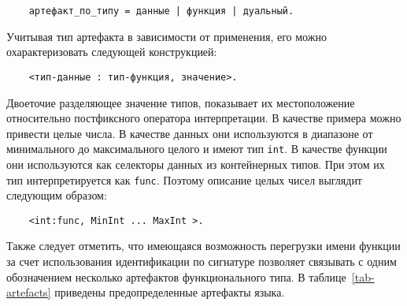 {\begin{verbatim}
    артефакт_по_типу = данные | функция | дуальный.
\end{verbatim}

Учитывая тип артефакта в зависимости от применения, его можно охарактеризовать следующей конструкцией:

\begin{verbatim}
    <тип-данные : тип-функция, значение>.
\end{verbatim}

Двоеточие разделяющее значение типов, показывает их местоположение относительно постфиксного оператора интерпретации. В качестве примера можно привести целые числа. В качестве данных они используются в диапазоне от минимального до максимального целого и имеют тип \verb|int|. В качестве функции они используются как селекторы данных из контейнерных типов. При этом их тип интерпретируется как \verb|func|. Поэтому описание целых чисел выглядит следующим образом:

\begin{verbatim}
    <int:func, MinInt ... MaxInt >.
\end{verbatim}

Также следует отметить, что имеющаяся возможность перегрузки имени функции за счет использования идентификации по сигнатуре позволяет связывать с одним обозначением несколько артефактов функционального типа. В таблице~\ref{tab-artefacts} приведены предопределенные артефакты языка.

}
